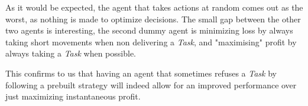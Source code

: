 \documentclass[11pt]{article}
\begin{document}
As it would be expected, the agent that takes actions at random comes out as the worst, as nothing is made to optimize decisions. The small gap between the other two agents is interesting, the second dummy agent is minimizing loss by always taking short movements when non delivering a \textit{Task}, and "maximising" profit by always taking a \textit{Task} when possible. 

This confirms to us that having an agent that sometimes refuses a \textit{Task} by following a prebuilt strategy will indeed allow for an improved performance over just maximizing instantaneous profit.
\end{document}
